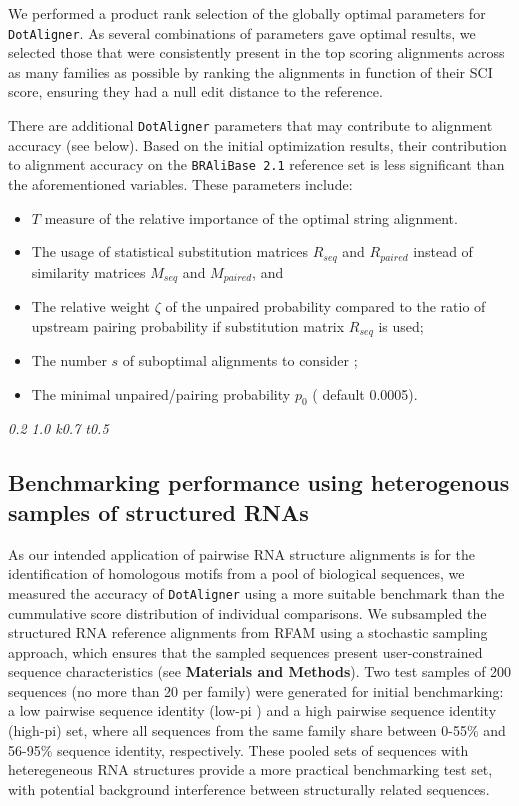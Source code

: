 \documentclass[a4paper,twoside]{article}
\newcommand\dotaligner{\texttt{DotAligner}}
\newcommand\bralibase{\texttt{BRAliBase 2.1}}
\begin{document}
We performed a product rank selection of the globally optimal parameters for \dotaligner{}. 
As several combinations of parameters gave optimal results, we selected those that were 
consistently present in the top scoring alignments across as many families as possible by 
ranking the alignments in function of their SCI score, ensuring they had a null edit distance 
to the reference.  


There are additional \dotaligner{} parameters that may contribute to alignment 
accuracy (see below). Based on the initial optimization results, their contribution
to alignment accuracy on the \bralibase{} reference set is less significant than the
aforementioned variables. These parameters include: 
\begin{itemize}
	\item $T$ measure of the relative importance of the optimal string alignment.
	\item The usage of statistical substitution matrices $R_{seq}$ and $R_{paired}$ instead of  similarity matrices $M_{seq}$ and $M_{paired}$, and
	\item The relative weight $\zeta$ of the unpaired probability compared to the 
	ratio of upstream pairing probability if substitution matrix $R_{seq}$ is used;
	\item The number $s$ of suboptimal alignments to consider ;
	\item The minimal unpaired/pairing probability $p_0$ ( default 0.0005).
\end{itemize}

\emph{0.2 1.0 k0.7 t0.5}

\subsection{Benchmarking performance using heterogenous samples of structured RNAs} 

\noindent As our intended application of pairwise RNA structure alignments is for the identification of homologous motifs from a pool of biological sequences, we measured the accuracy of \dotaligner{} using a more suitable benchmark than the cummulative score distribution of individual comparisons. We subsampled the structured RNA reference alignments from RFAM \cite{nawrocki2014rfam} using a stochastic sampling approach, which ensures that the sampled sequences present user-constrained sequence characteristics (see \textbf{Materials and Methods}). Two test samples of 200 sequences (no more than 20 per family) were generated for initial benchmarking: a low pairwise sequence identity (low-pi ) and a high pairwise sequence identity (high-pi) set, where all sequences from the same family share between 0-55\% and 56-95\% sequence identity, respectively. These pooled sets of sequences with heteregeneous RNA structures provide a more practical benchmarking test set, with potential background interference between structurally related sequences. \\
\end{document}
